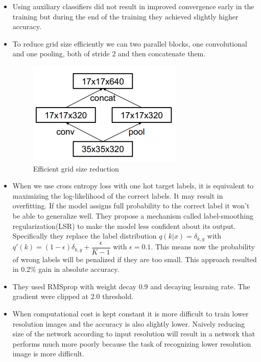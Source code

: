 \documentclass{article}
\begin{document}
\begin{itemize}
\begin{enumerate}
    \end{enumerate}
    \item Using auxiliary classifiers did not result in improved convergence early in the training but during the end of the training they achieved slightly higher accuracy.
    \item To reduce grid size efficiently we can two parallel blocks, one convolutional and one pooling, both of stride 2 and then concatenate them.  
    \begin{figure}[H]
        \centering
        \includegraphics[scale=0.75]{grid_reduction.PNG}
        \caption{Efficient grid size reduction}
        \label{fig:Figure 1}
    \end{figure}
    \item When we use cross entropy loss with one hot target labels, it is equivalent to maximizing the log-likelihood of the correct labels. It may result in overfitting. If the model assigns full probability to the correct label it won't be able to generalize well. They propose a mechanism called label-smoothing regularization(LSR) to make the model less confident about its output. Specifically they replace the label distribution $q(k|x)=\delta_{k,y}$ with $q'(k)=(1-\epsilon)\delta_{k,y}+\dfrac{\epsilon}{K-1}$ with $\epsilon = 0.1$. This means now the probability of wrong labels will be penalized if they are too small. This approach resulted in 0.2\% gain in absolute accuracy.
    \item They used RMSprop with weight decay 0.9 and decaying learning rate. The gradient were clipped at 2.0 threshold.
    \item When computational cost is kept constant it is more difficult to train lower resolution images and the accuracy is also slightly lower. Naively reducing size of the network according to input resolution will result in a network that performs much more poorly because the task of recognizing lower resolution image is more difficult. 
\end{itemize}
\end{document}
